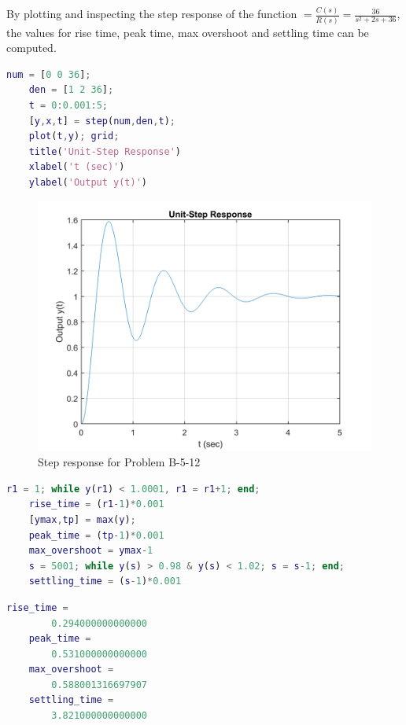 \documentclass[12pt]{article}
\newenvironment{problem}[2][Problem]{\begin{trivlist}
		\item[\hskip \labelsep {\bfseries #1}\hskip \labelsep {\bfseries #2.}]}{\end{trivlist}}
\begin{document}
\begin{problem}{8 --- B-5-12 --- Matlab computations} \hfill\newline
	By plotting and inspecting the step response of the function $\displaystyle=\frac{C(s)}{R(s)}=\frac{36}{s^2+2s+36}$, the values for rise time, peak time, max overshoot and settling time can be computed.
\begin{lstlisting}[language = Matlab]
	num = [0 0 36];
	den = [1 2 36];
	t = 0:0.001:5;
	[y,x,t] = step(num,den,t);
	plot(t,y); grid;
	title('Unit-Step Response')
	xlabel('t (sec)')
	ylabel('Output y(t)')
\end{lstlisting}
\begin{figure}[H]
	\centering
	\includegraphics[width=0.7\linewidth]{Images/Q8Step}
	\caption{Step response for Problem B-5-12}
	\label{fig:q8step}
\end{figure}

\begin{lstlisting}[language = Matlab]
	r1 = 1; while y(r1) < 1.0001, r1 = r1+1; end;  
	rise_time = (r1-1)*0.001
	[ymax,tp] = max(y);
	peak_time = (tp-1)*0.001
	max_overshoot = ymax-1	
	s = 5001; while y(s) > 0.98 & y(s) < 1.02; s = s-1; end;
	settling_time = (s-1)*0.001
\end{lstlisting}
\begin{lstlisting}[language = Matlab]
	rise_time =
		0.294000000000000
	peak_time =
		0.531000000000000
	max_overshoot =
		0.588001316697907
	settling_time =
		3.821000000000000
\end{lstlisting}
\end{problem}
\end{document}
